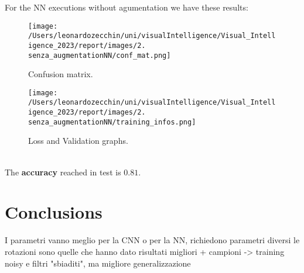 \documentclass{report}
\def\weight{0.7}
\begin{document}
For the NN executions without agumentation we have these results:
\begin{figure}[ht!]
    \centering
    \begin{minipage}[b]{\weight\linewidth}
      \texttt{[image: /Users/leonardozecchin/uni/visualIntelligence/Visual\_Intelligence\_2023/report/images/2. senza\_augmentationNN/conf\_mat.png]}
      \caption{Confusion matrix.}
      \label{fig:image1}
    \end{minipage}
    \hspace{0.5cm}
    \begin{minipage}[b]{\weight\linewidth}
      \texttt{[image: /Users/leonardozecchin/uni/visualIntelligence/Visual\_Intelligence\_2023/report/images/2. senza\_augmentationNN/training\_infos.png]}
      \caption{Loss and Validation graphs.}
      \label{fig:image2}
    \end{minipage}
\end{figure}\\
The \textbf{accuracy} reached in test is $0.81$.\\


\chapter{Conclusions}
I parametri vanno meglio per la CNN o per la NN, richiedono parametri diversi
le rotazioni sono quelle che hanno dato risultati migliori
+ campioni -> training noisy e filtri "sbiaditi", ma migliore generalizzazione
\end{document}

